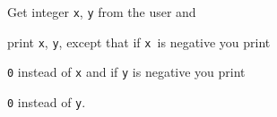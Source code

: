 Get integer \texttt{x}, \texttt{y} from the user and

print \texttt{x}, \texttt{y}, except that if \texttt{x }is negative you print

\texttt{0} instead of \texttt{x} and if \texttt{y} is negative you print

\texttt{0} instead of \texttt{y}.

